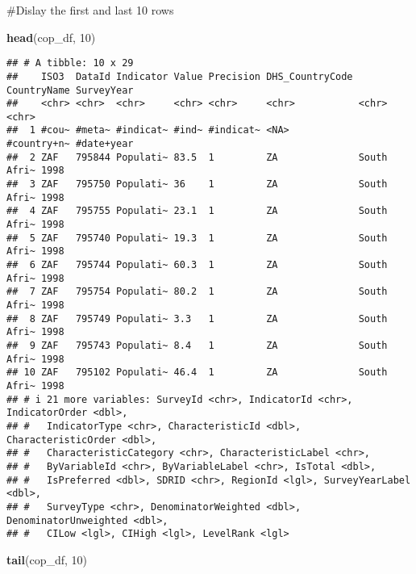 \documentclass[
]{article}
\newenvironment{Shaded}{\begin{snugshade}}{\end{snugshade}}
\newcommand{\DecValTok}[1]{\textcolor[rgb]{0.00,0.00,0.81}{#1}}
\newcommand{\FunctionTok}[1]{\textcolor[rgb]{0.13,0.29,0.53}{\textbf{#1}}}
\newcommand{\NormalTok}[1]{#1}
\begin{document}
\#Dislay the first and last 10 rows

\begin{Shaded}
\begin{Highlighting}[]
\FunctionTok{head}\NormalTok{(cop\_df, }\DecValTok{10}\NormalTok{)}
\end{Highlighting}
\end{Shaded}

\begin{verbatim}
## # A tibble: 10 x 29
##    ISO3  DataId Indicator Value Precision DHS_CountryCode CountryName SurveyYear
##    <chr> <chr>  <chr>     <chr> <chr>     <chr>           <chr>       <chr>     
##  1 #cou~ #meta~ #indicat~ #ind~ #indicat~ <NA>            #country+n~ #date+year
##  2 ZAF   795844 Populati~ 83.5  1         ZA              South Afri~ 1998      
##  3 ZAF   795750 Populati~ 36    1         ZA              South Afri~ 1998      
##  4 ZAF   795755 Populati~ 23.1  1         ZA              South Afri~ 1998      
##  5 ZAF   795740 Populati~ 19.3  1         ZA              South Afri~ 1998      
##  6 ZAF   795744 Populati~ 60.3  1         ZA              South Afri~ 1998      
##  7 ZAF   795754 Populati~ 80.2  1         ZA              South Afri~ 1998      
##  8 ZAF   795749 Populati~ 3.3   1         ZA              South Afri~ 1998      
##  9 ZAF   795743 Populati~ 8.4   1         ZA              South Afri~ 1998      
## 10 ZAF   795102 Populati~ 46.4  1         ZA              South Afri~ 1998      
## # i 21 more variables: SurveyId <chr>, IndicatorId <chr>, IndicatorOrder <dbl>,
## #   IndicatorType <chr>, CharacteristicId <dbl>, CharacteristicOrder <dbl>,
## #   CharacteristicCategory <chr>, CharacteristicLabel <chr>,
## #   ByVariableId <chr>, ByVariableLabel <chr>, IsTotal <dbl>,
## #   IsPreferred <dbl>, SDRID <chr>, RegionId <lgl>, SurveyYearLabel <dbl>,
## #   SurveyType <chr>, DenominatorWeighted <dbl>, DenominatorUnweighted <dbl>,
## #   CILow <lgl>, CIHigh <lgl>, LevelRank <lgl>
\end{verbatim}

\begin{Shaded}
\begin{Highlighting}[]
\FunctionTok{tail}\NormalTok{(cop\_df, }\DecValTok{10}\NormalTok{)}
\end{Highlighting}
\end{Shaded}
\end{document}
